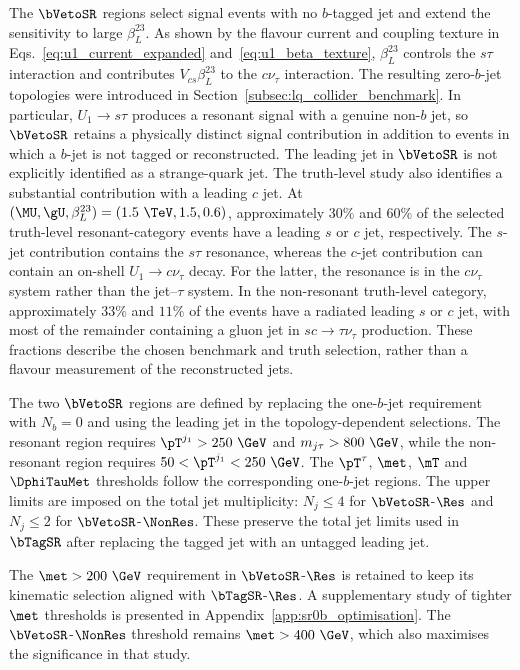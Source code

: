 The $\bVetoSR$ regions select signal events with no $b$-tagged jet and extend the sensitivity to large $\beta_L^{23}$.
As shown by the flavour current and coupling texture in Eqs.~\ref{eq:u1_current_expanded} and~\ref{eq:u1_beta_texture}, $\beta_L^{23}$ controls the $s\tau$ interaction and contributes $V_{cs}\beta_L^{23}$ to the $c\nu_\tau$ interaction.
The resulting zero-$b$-jet topologies were introduced in Section~\ref{subsec:lq_collider_benchmark}.
In particular, $U_1\to s\tau$ produces a resonant signal with a genuine non-$b$ jet, so $\bVetoSR$ retains a physically distinct signal contribution in addition to events in which a $b$-jet is not tagged or reconstructed.
The leading jet in $\bVetoSR$ is not explicitly identified as a strange-quark jet.
The truth-level study also identifies a substantial contribution with a leading $c$ jet.
At $(\MU,\gU,\beta_L^{23})=(1.5~\TeV,1.5,0.6)$, approximately $30\%$ and $60\%$ of the selected truth-level resonant-category events have a leading $s$ or $c$ jet, respectively.
The $s$-jet contribution contains the $s\tau$ resonance, whereas the $c$-jet contribution can contain an on-shell $U_1\to c\nu_\tau$ decay.
For the latter, the resonance is in the $c\nu_\tau$ system rather than the jet--$\tau$ system.
In the non-resonant truth-level category, approximately $33\%$ and $11\%$ of the events have a radiated leading $s$ or $c$ jet, with most of the remainder containing a gluon jet in $sc\to\tau\nu_\tau$ production.
These fractions describe the chosen benchmark and truth selection, rather than a flavour measurement of the reconstructed jets.

The two $\bVetoSR$ regions are defined by replacing the one-$b$-jet requirement with $N_b=0$ and using the leading jet in the topology-dependent selections.
The resonant region requires $\pT^{j_1}>250~\GeV$ and $m_{j\tau}>800~\GeV$, while the non-resonant region requires $50<\pT^{j_1}<250~\GeV$.
The $\pT^\tau$, $\met$, $\mT$ and $\DphiTauMet$ thresholds follow the corresponding one-$b$-jet regions.
The upper limits are imposed on the total jet multiplicity: $N_j\leq4$ for $\bVetoSR$-$\Res$ and $N_j\leq2$ for $\bVetoSR$-$\NonRes$.
These preserve the total jet limits used in $\bTagSR$ after replacing the tagged jet with an untagged leading jet.

The $\met>200~\GeV$ requirement in $\bVetoSR$-$\Res$ is retained to keep its kinematic selection aligned with $\bTagSR$-$\Res$.
A supplementary study of tighter $\met$ thresholds is presented in Appendix~\ref{app:sr0b_optimisation}.
The $\bVetoSR$-$\NonRes$ threshold remains $\met>400~\GeV$, which also maximises the significance in that study.

